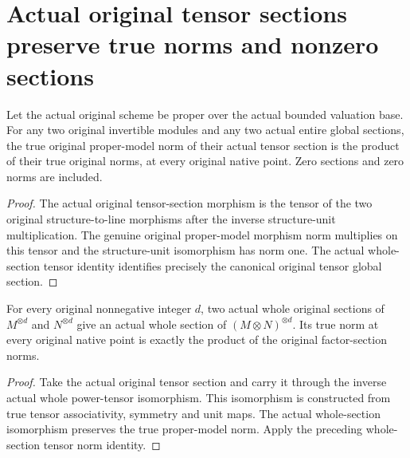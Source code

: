\section{Actual original tensor sections preserve true norms and nonzero sections}
\label{sec:scheme-global-section-tensor-product-norms}

\begin{theorem}
\label{thm:scheme-global-section-tensor-norm}
\leanok
{}
Let the actual original scheme be proper over the actual bounded valuation
base. For any two original invertible modules and any two actual entire global
sections, the true original proper-model norm of their actual tensor section
is the product of their true original norms, at every original native point.
Zero sections and zero norms are included.
\end{theorem}
\begin{proof}
The actual original tensor-section morphism is the tensor of the two original
structure-to-line morphisms after the inverse structure-unit multiplication.
The genuine original proper-model morphism norm multiplies on this tensor and
the structure-unit isomorphism has norm one. The actual whole-section tensor
identity identifies precisely the canonical original tensor global section.
\end{proof}

\begin{theorem}
\label{thm:scheme-global-section-power-tensor-norm}
\leanok
{}
For every original nonnegative integer $d$, two actual whole original sections
of $M^{\otimes d}$ and $N^{\otimes d}$ give an actual whole section of
$(M\otimes N)^{\otimes d}$. Its true norm at every original native point is
exactly the product of the original factor-section norms.
\end{theorem}
\begin{proof}
Take the actual original tensor section and carry it through the inverse
actual whole power-tensor isomorphism. This isomorphism is constructed from
true tensor associativity, symmetry and unit maps. The actual whole-section
isomorphism preserves the true proper-model norm. Apply the preceding
whole-section tensor norm identity.
\end{proof}

